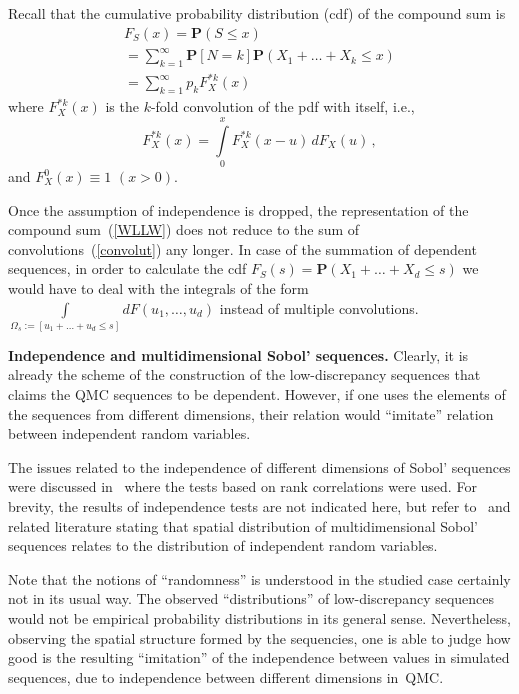 \begin{multicols}{2}
Recall that the cumulative probability distribution (cdf) of the compound sum is
\begin{multline}
\label{WLLW}
F_S(x)=\mathbf{P}(S\leq x)\\
{}=
\sum_{k=1}^{\infty}\mathbf{P}[N=k]\mathbf{P}\left(
{X_1 + \dots + X_k\leq x}\right)\\
{}=\sum_{k=1}^{\infty} p_k F_X^{*k}(x)
\end{multline}
where $F_X^{*k}(x)$ is the $k$-fold convolution of the pdf with itself, i.e.,
\begin{equation}
\label{convolut}
F_X^{*k}(x)=\int\limits_0^{x}F_X^{*k}(x-u)\,dF_X(u)\,,
\end{equation}
and $F_X^{0}(x)\equiv 1\,\,(x>0)$.

Once the assumption of independence is dropped, the representation of the compound sum~(\ref{WLLW})
does not reduce to the sum of convolutions~(\ref{convolut}) any longer.
In case of the summation of dependent sequences, in order
to calculate the cdf $F_S(s)=\mathbf{P}\left(X_1+\dots+X_d \leq s\right)$ we would have to
deal with the
integrals of the form $\int\limits_{\Omega_s:=\left[u_1+\dots+u_d\leq s\right]}dF(u_1,\dots,u_d)$
instead of multiple convolutions.

\medskip

\noindent
\textbf{Independence and multidimensional Sobol' sequences.}
Clearly, it is already the scheme of the construction of the
low-discrepancy sequences that claims the QMC sequences to be
dependent. However, if one uses the elements of the sequences from
different dimensions, their relation would ``imitate'' relation
between independent random variables.

The issues related to the independence of different dimensions of
Sobol' sequences were discussed in~\cite{Prakash} where the tests
based on rank correlations were used. For brevity,
the results of independence tests are not indicated here, but refer to~\cite{Prakash}
and related literature stating that spatial
distribution of multidimensional Sobol' sequences relates to the
distribution of independent random variables.

Note that the notions of ``randomness'' is understood in the studied case
certainly not in its usual way. The observed ``distributions'' of
low-discrepancy sequences would not be empirical
probability distributions in its general sense. Nevertheless,
observing the spatial structure formed by the sequencies, one is
able to judge how good is the resulting ``imitation'' of the
independence between values in simulated sequences, due to
independence between different dimensions in~QMC.
{

}
\end{multicols}
